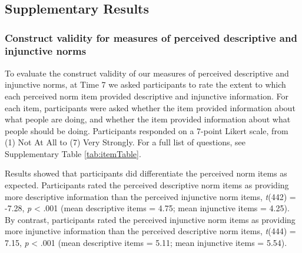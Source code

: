\documentclass[
  english,
  man,floatsintext]{apa6}
\begin{document}
\endgroup

\newpage

\hypertarget{appendix-appendix}{%
\appendix}


\renewcommand{\appendixname}{\textbf{Supplementary Materials}}
\renewcommand{\thefigure}{S\arabic{figure}} \setcounter{figure}{0}
\renewcommand{\thetable}{S\arabic{table}} \setcounter{table}{0}
\renewcommand{\theequation}{S\arabic{table}} \setcounter{equation}{0}

\hypertarget{section}{%
\section{}\label{section}}

\hypertarget{supplementary-results}{%
\subsection{Supplementary Results}\label{supplementary-results}}

\hypertarget{construct-validity-for-measures-of-perceived-descriptive-and-injunctive-norms}{%
\subsubsection{Construct validity for measures of perceived descriptive and injunctive norms}\label{construct-validity-for-measures-of-perceived-descriptive-and-injunctive-norms}}

To evaluate the construct validity of our measures of perceived descriptive and injunctive norms, at Time 7 we asked participants to rate the extent to which each perceived norm item provided descriptive and injunctive information. For each item, participants were asked whether the item provided information about what people are doing, and whether the item provided information about what people should be doing. Participants responded on a 7-point Likert scale, from (1) Not At All to (7) Very Strongly. For a full list of questions, see Supplementary Table \ref{tab:itemTable}.

Results showed that participants did differentiate the perceived norm items as expected. Participants rated the perceived descriptive norm items as providing more descriptive information than the perceived injunctive norm items, \emph{t}(442) = -7.28, \emph{p} \textless{} .001 (mean descriptive items = 4.75; mean injunctive items = 4.25). By contrast, participants rated the perceived injunctive norm items as providing more injunctive information than the perceived descriptive norm items, \emph{t}(444) = 7.15, \emph{p} \textless{} .001 (mean descriptive items = 5.11; mean injunctive items = 5.54).
\end{document}
